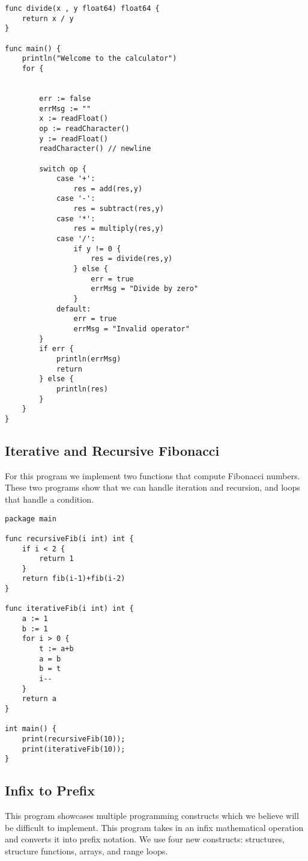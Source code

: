 \documentclass{article}
\begin{document}
\begin{appendices}
\begin{lstlisting}[title=Basic Calculator]
func divide(x , y float64) float64 {
    return x / y
}

func main() {
    println("Welcome to the calculator")
    for {
        

        err := false
        errMsg := ""
        x := readFloat()
        op := readCharacter()
        y := readFloat()
        readCharacter() // newline

        switch op {
            case '+':
                res = add(res,y)
            case '-':
                res = subtract(res,y)
            case '*':
                res = multiply(res,y)
            case '/':
                if y != 0 {
                    res = divide(res,y)
                } else {
                    err = true
                    errMsg = "Divide by zero"
                }
            default:
                err = true
                errMsg = "Invalid operator"
        }
        if err {
            println(errMsg)
            return
        } else {
            println(res)
        }
    }
}
\end{lstlisting}

\subsection{Iterative and Recursive Fibonacci}

For this program we implement two functions that compute Fibonacci numbers.  These two 
programs show that we can handle iteration and recursion, and loops that handle a condition. 

\begin{lstlisting}[title=Iterative and Recursive Fibonacci]
package main

func recursiveFib(i int) int {
    if i < 2 {
        return 1
    }
    return fib(i-1)+fib(i-2)
}

func iterativeFib(i int) int {
    a := 1
    b := 1
    for i > 0 {
        t := a+b
        a = b
        b = t
        i--
    }
    return a
}

int main() {
    print(recursiveFib(10));
    print(iterativeFib(10));
}

\end{lstlisting}

\subsection{Infix to Prefix}

This program showcases multiple programming constructs which we believe will be difficult to implement.
This program takes in an infix mathematical operation and converts it into prefix notation.
We use four new constructs: structures, structure functions, arrays, and range loops.


\end{appendices}
\end{document}
